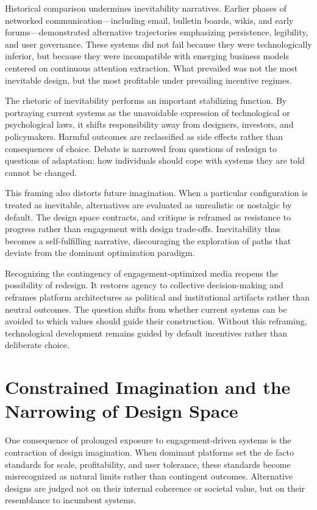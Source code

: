\documentclass[12pt]{article}
\begin{document}
Historical comparison undermines inevitability narratives. Earlier phases of networked communication—including email, bulletin boards, wikis, and early forums—demonstrated alternative trajectories emphasizing persistence, legibility, and user governance. These systems did not fail because they were technologically inferior, but because they were incompatible with emerging business models centered on continuous attention extraction. What prevailed was not the most inevitable design, but the most profitable under prevailing incentive regimes.

The rhetoric of inevitability performs an important stabilizing function. By portraying current systems as the unavoidable expression of technological or psychological laws, it shifts responsibility away from designers, investors, and policymakers. Harmful outcomes are reclassified as side effects rather than consequences of choice. Debate is narrowed from questions of redesign to questions of adaptation: how individuals should cope with systems they are told cannot be changed.

This framing also distorts future imagination. When a particular configuration is treated as inevitable, alternatives are evaluated as unrealistic or nostalgic by default. The design space contracts, and critique is reframed as resistance to progress rather than engagement with design trade-offs. Inevitability thus becomes a self-fulfilling narrative, discouraging the exploration of paths that deviate from the dominant optimization paradigm.

Recognizing the contingency of engagement-optimized media reopens the possibility of redesign. It restores agency to collective decision-making and reframes platform architectures as political and institutional artifacts rather than neutral outcomes. The question shifts from whether current systems can be avoided to which values should guide their construction. Without this reframing, technological development remains guided by default incentives rather than deliberate choice.

\section{Constrained Imagination and the Narrowing of Design Space}

One consequence of prolonged exposure to engagement-driven systems is the contraction of design imagination. When dominant platforms set the de facto standards for scale, profitability, and user tolerance, these standards become misrecognized as natural limits rather than contingent outcomes. Alternative designs are judged not on their internal coherence or societal value, but on their resemblance to incumbent systems.
\end{document}
